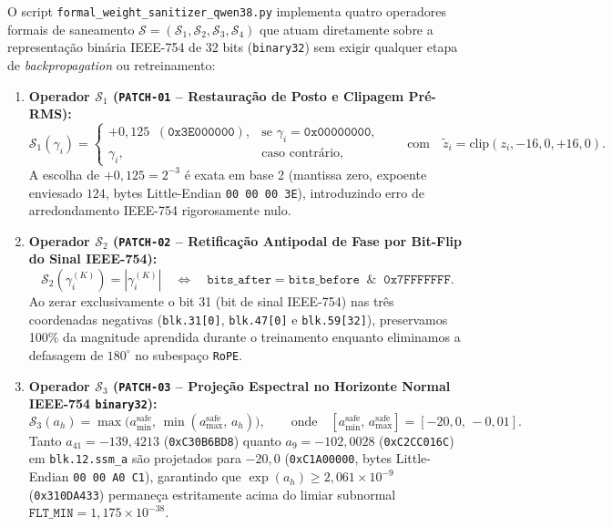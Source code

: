 \documentclass[11pt,a4paper]{article}
\theoremstyle{definition}
\begin{document}
O script \texttt{formal\_weight\_sanitizer\_qwen38.py} implementa quatro operadores formais de saneamento $\mathcal{S} = (\mathcal{S}_1, \mathcal{S}_2, \mathcal{S}_3, \mathcal{S}_4)$ que atuam diretamente sobre a representação binária IEEE-754 de 32 bits (\texttt{binary32}) sem exigir qualquer etapa de \textit{backpropagation} ou retreinamento:

\begin{enumerate}
    \item \textbf{Operador $\mathcal{S}_1$ (\texttt{PATCH-01} -- Restauração de Posto e Clipagem Pré-RMS):}
    \begin{equation}
        \mathcal{S}_1(\gamma_i) = \begin{cases}
            +0{,}125 \;\; (\texttt{0x3E000000}), & \text{se } \gamma_i = \texttt{0x00000000}, \\
            \gamma_i, & \text{caso contrário},
        \end{cases}
        \qquad \text{com} \quad \tilde{z}_i = \text{clip}(z_i, -16{,}0, +16{,}0).
    \end{equation}
    A escolha de $+0{,}125 = 2^{-3}$ é exata em base 2 (mantissa zero, expoente enviesado $124$, bytes Little-Endian \texttt{00 00 00 3E}), introduzindo erro de arredondamento IEEE-754 rigorosamente nulo.

    \item \textbf{Operador $\mathcal{S}_2$ (\texttt{PATCH-02} -- Retificação Antipodal de Fase por Bit-Flip do Sinal IEEE-754):}
    \begin{equation}
        \mathcal{S}_2(\gamma_i^{(K)}) = |\gamma_i^{(K)}| \quad \Longleftrightarrow \quad \texttt{bits\_after} = \texttt{bits\_before} \;\; \& \;\; \texttt{0x7FFFFFFF}.
    \end{equation}
    Ao zerar exclusivamente o bit 31 (bit de sinal IEEE-754) nas três coordenadas negativas (\texttt{blk.31[0]}, \texttt{blk.47[0]} e \texttt{blk.59[32]}), preservamos 100\% da magnitude aprendida durante o treinamento enquanto eliminamos a defasagem de $180^\circ$ no subespaço \texttt{RoPE}.

    \item \textbf{Operador $\mathcal{S}_3$ (\texttt{PATCH-03} -- Projeção Espectral no Horizonte Normal IEEE-754 \texttt{binary32}):}
    \begin{equation}
        \mathcal{S}_3(a_h) = \max\big(a_{\min}^{\text{safe}},\, \min(a_{\max}^{\text{safe}},\, a_h)\big), \qquad \text{onde} \quad [a_{\min}^{\text{safe}},\, a_{\max}^{\text{safe}}] = [-20{,}0,\, -0{,}01].
    \end{equation}
    Tanto $a_{41} = -139{,}4213$ (\texttt{0xC30B6BD8}) quanto $a_9 = -102{,}0028$ (\texttt{0xC2CC016C}) em \texttt{blk.12.ssm\_a} são projetados para $-20{,}0$ (\texttt{0xC1A00000}, bytes Little-Endian \texttt{00 00 A0 C1}), garantindo que $\exp(a_h) \ge 2{,}061 \times 10^{-9}$ (\texttt{0x310DA433}) permaneça estritamente acima do limiar subnormal $\texttt{FLT\_MIN} = 1{,}175 \times 10^{-38}$.


\end{enumerate}
\end{document}
